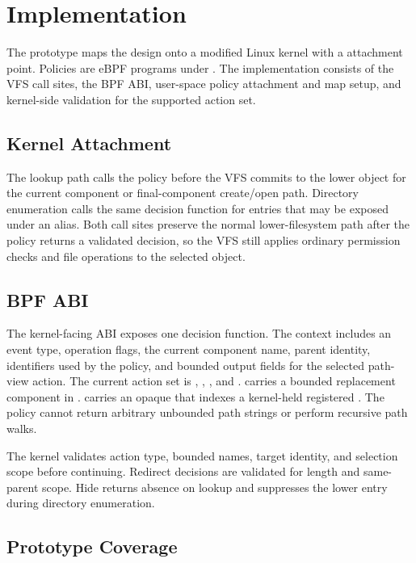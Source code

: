\section{Implementation}
\label{sec:implementation}

The prototype maps the design onto a modified Linux kernel with a
 attachment point. Policies are eBPF programs under
. The implementation consists of the VFS call
sites, the BPF ABI, user-space policy attachment and map setup, and kernel-side
validation for the supported action set.

\subsection{Kernel Attachment}

The lookup path calls the policy before the VFS commits to the lower object for
the current component or final-component create/open path. Directory
enumeration calls the same decision function for entries that may be exposed
under an alias. Both call sites preserve the normal lower-filesystem path after
the policy returns a validated decision, so the VFS still applies ordinary
permission checks and file operations to the selected object.

\subsection{BPF ABI}

The kernel-facing ABI exposes one decision function. The context includes an
event type, operation flags, the current component name, parent identity,
identifiers used by the policy, and bounded output fields for the selected
path-view action. The current action set is , ,
, and .  carries a bounded
replacement component in .  carries an
opaque  that indexes a kernel-held registered . The policy cannot return arbitrary unbounded path strings or perform
recursive path walks.

The kernel validates action type, bounded names, target identity, and selection
scope before continuing. Redirect decisions are validated for length and
same-parent scope. Hide returns absence on lookup and suppresses the lower
entry during directory enumeration.

\subsection{Prototype Coverage}

